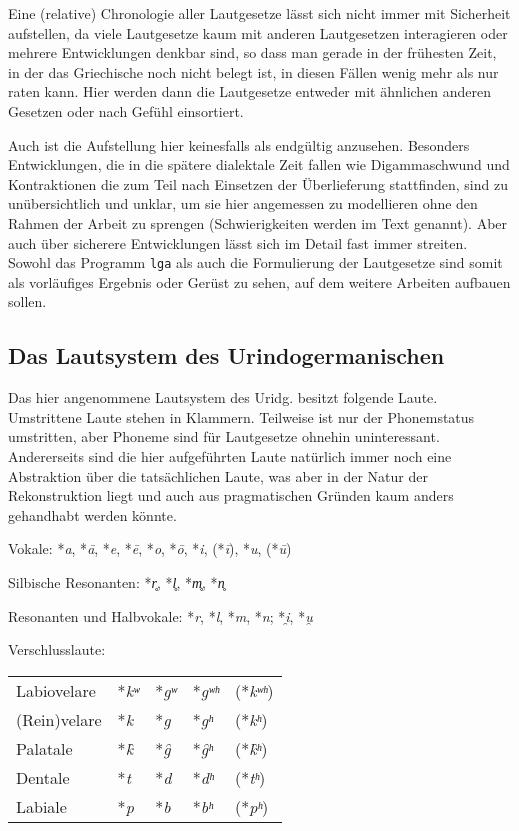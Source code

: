 \documentclass[12pt,a4paper,normalheadings]{scrartcl}
\def\rek#1{*\textit{#1}}
\def\tt#1{\texttt{#1}}
\begin{document}
Eine (relative) Chronologie aller Lautgesetze lässt sich nicht immer
mit Sicherheit aufstellen,
da viele Lautgesetze kaum mit anderen Lautgesetzen interagieren
oder mehrere Entwicklungen denkbar sind,
so dass man gerade in der frühesten Zeit,
in der das Griechische noch nicht belegt ist,
in diesen Fällen wenig mehr als nur raten kann.
Hier werden dann die Lautgesetze entweder mit ähnlichen
anderen Gesetzen oder nach Gefühl einsortiert.

Auch ist die Aufstellung hier keinesfalls als endgültig anzusehen.
Besonders Entwicklungen, die in die spätere dialektale Zeit fallen
wie Digammaschwund und Kontraktionen
die zum Teil nach Einsetzen der Überlieferung stattfinden,
sind zu unübersichtlich und unklar,
um sie hier angemessen zu modellieren ohne den Rahmen der Arbeit zu sprengen
(Schwierigkeiten werden im Text genannt).
Aber auch über sicherere Entwicklungen lässt sich im Detail fast immer streiten.
Sowohl das Programm \tt{lga} als auch die Formulierung
der Lautgesetze sind somit als vorläufiges Ergebnis oder Gerüst zu sehen,
auf dem weitere Arbeiten aufbauen sollen.

\subsection{Das Lautsystem des Urindogermanischen}


Das hier angenommene Lautsystem des Uridg. besitzt folgende Laute.
Umstrittene Laute stehen in Klammern.
Teilweise ist nur der Phonemstatus umstritten,
aber Phoneme sind für Lautgesetze ohnehin uninteressant.
Andererseits sind die hier aufgeführten Laute natürlich immer noch
eine Abstraktion über die tatsächlichen Laute,
was aber in der Natur der Rekonstruktion liegt
und auch aus pragmatischen Gründen kaum anders gehandhabt werden könnte.

\bigskip
\noindent
Vokale: \rek{a}, \rek{ā}, \rek{e}, \rek{ē}, \rek{o}, \rek{ō},
\rek{i}, (\rek{ī}), \rek{u}, (\rek{ū})

\noindent
Silbische Resonanten: \rek{r̥}, \rek{l̥}, \rek{m̥}, \rek{n̥}

\noindent
Resonanten und Halbvokale: \rek{r}, \rek{l}, \rek{m}, \rek{n}; \rek{i̯}, \rek{u̯}

\noindent
Verschlusslaute:\\
\begin{tabular}{l l l l l}
Labiovelare & \rek{kʷ} & \rek{gʷ} & \rek{gʷʰ} & (\rek{kʷʰ})\\
(Rein)velare & \rek{k} & \rek{g} & \rek{gʰ} & (\rek{kʰ})\\
Palatale & \rek{k̑} & \rek{g̑} & \rek{g̑ʰ} & (\rek{k̑ʰ})\\
Dentale & \rek{t} & \rek{d} & \rek{dʰ} & (\rek{tʰ})\\
Labiale & \rek{p} & \rek{b} & \rek{bʰ} & (\rek{pʰ})\\
\end{tabular}
\end{document}
